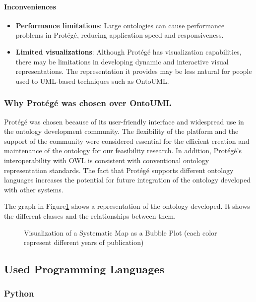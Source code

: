     \paragraph{Inconveniences}
    \begin{itemize}
        \item \textbf{Performance limitations}: Large ontologies can cause performance problems in Protégé, reducing application speed and responsiveness.
        \item \textbf{Limited visualizations}: Although Protégé has visualization capabilities, there may be limitations in developing dynamic and interactive visual representations. The representation it provides may be less natural for people used to UML-based techniques such as OntoUML.
    \end{itemize}
    

    \subsubsection{Why Protégé was chosen over OntoUML}
    Protégé was chosen because of its user-friendly interface and widespread use in the ontology development community. The flexibility of the platform and the support of the community were considered essential for the efficient creation and maintenance of the ontology for our feasibility research. In addition, Protégé's interoperability with OWL is consistent with conventional ontology representation standards. The fact that Protégé supports different ontology languages increases the potential for future integration of the ontology developed with other systems.
    
    The graph in Figure\ref{fig:viz-ontology} shows a representation of the ontology developed. It shows the different classes and the relationships between them.
    
    \begin{figure}[p]
        
         \caption{\label{fig:viz-ontology}  Visualization of a Systematic Map as a Bubble Plot (each color represent different years of publication)}
    \end{figure}

    
\subsection{Used Programming Languages}
    \subsubsection{Python}
